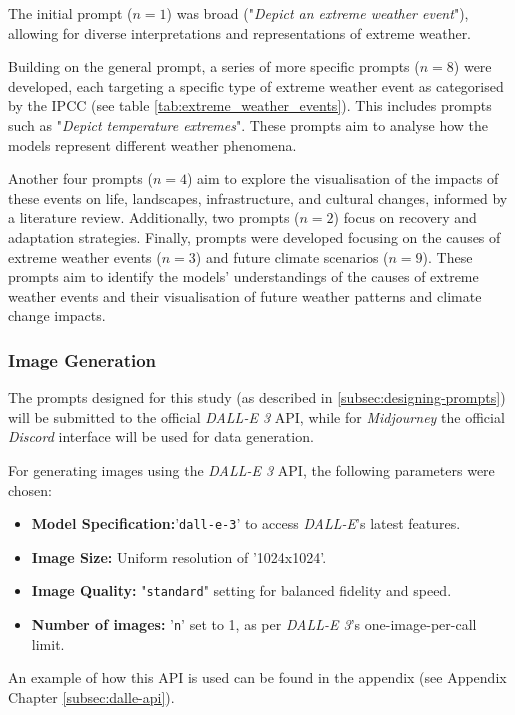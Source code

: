 The initial prompt ($n=1$) was broad ("\textit{Depict an extreme weather event}"), allowing for diverse interpretations and representations of extreme weather.

Building on the general prompt, a series of more specific prompts ($n=8$) were developed, each targeting a specific type of extreme weather event as categorised by the IPCC (see table \ref{tab:extreme_weather_events}). This includes prompts such as "\textit{Depict temperature extremes}". These prompts aim to analyse how the models represent different weather phenomena.

Another four prompts ($n=4$) aim to explore the visualisation of the impacts of these events on life, landscapes, infrastructure, and cultural changes, informed by a literature review. Additionally, two prompts ($n=2$) focus on recovery and adaptation strategies. Finally, prompts were developed focusing on the causes of extreme weather events ($n=3$) and future climate scenarios ($n=9$). These prompts aim to identify the models' understandings of the causes of extreme weather events and their visualisation of future weather patterns and climate change impacts.

\subsubsection{Image Generation}
The prompts designed for this study (as described in \ref{subsec:designing-prompts}) will be submitted to the official \textit{DALL-E 3} API, while for  \textit{Midjourney} the official \textit{Discord} interface will be used for data generation.

\noindent
For generating images using the \textit{DALL-E 3} API, the following parameters were chosen:

\begin{itemize}
\item \textbf{Model Specification:}'\texttt{dall-e-3}' to access \textit{DALL-E}'s latest features.
\item \textbf{Image Size:} Uniform resolution of '1024x1024'.
\item \textbf{Image Quality:} "\texttt{standard}" setting for balanced fidelity and speed.
\item \textbf{Number of images:} '\texttt{n}' set to 1, as per \textit{DALL-E 3}'s one-image-per-call limit.
\end{itemize}

\noindent An example of how this API is used can be found in the appendix (see Appendix Chapter \ref{subsec:dalle-api}).
\vspace{4mm}


